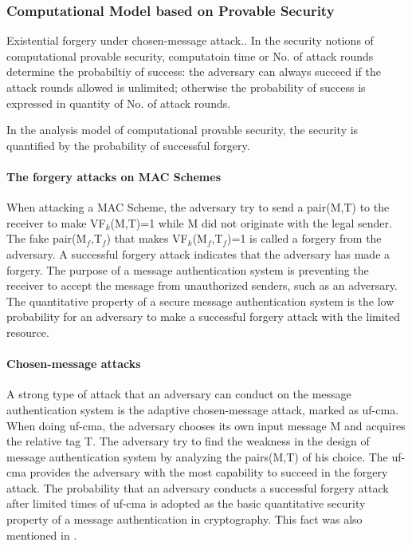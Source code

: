 \documentclass{article}
\begin{document}
\subsubsection{Computational Model based on Provable Security}
Existential forgery under chosen-message attack.\cite{keylist}.
In the security notions of computational provable security, computatoin time or No. of attack rounds determine the probabiltiy of success: the adversary can always succeed if the attack rounds allowed is unlimited; otherwise the probability of success is expressed in quantity of No. of attack rounds.

In the analysis model of computational provable security, the security is quantified by the probability of successful forgery.

\paragraph{The forgery attacks on MAC Schemes}
When attacking a MAC Scheme, the adversary try to send a pair(M,T) to the receiver to make VF$_k$(M,T)=1 while M did not originate with the legal sender. The fake pair(M$_f$,T$_f$) that makes VF$_k$(M$_f$,T$_f$)=1 is called a forgery from the adversary. A successful forgery attack indicates that the adversary has made a forgery. 
The purpose of a message authentication system is preventing the receiver to accept the message from unauthorized senders, such as an adversary. The quantitative property of a secure message authentication system is the low probability for an adversary to make a successful forgery attack with the limited resource.
\paragraph{Chosen-message attacks}
A strong type of attack that an adversary can conduct on the message authentication system is the adaptive chosen-message attack, marked as uf-cma. When doing uf-cma, the adversary chooses its own input message M and acquires the relative tag T. The adversary try to find the weakness in the design of message authentication system by analyzing the pairs(M,T) of his choice. The uf-cma provides the adversary with the most capability to succeed in the forgery attack. The probability that an adversary conducts a successful forgery attack after limited times of uf-cma is adopted as the basic quantitative security property of a message authentication in cryptography. This fact was also mentioned in \cite{Rogaway2011}.
\end{document}
